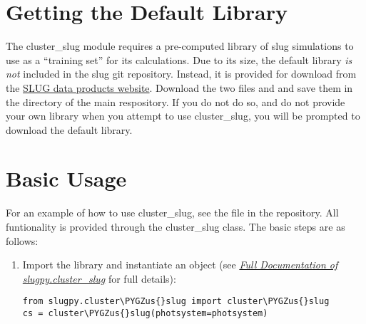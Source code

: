 \documentclass[letterpaper,10pt,english]{sphinxmanual}
\def\PYGZus{\char`\_}
\begin{document}
\section{Getting the Default Library}
\label{cluster_slug:getting-the-default-library}
The cluster\_slug module requires a pre-computed library of slug simulations to use as a ``training set'' for its calculations. Due to its size, the default library \emph{is not} included in the slug git repository. Instead, it is provided for download from the \href{http://www.slugsps.com/data}{SLUG data products website}. Download the two files  and  and save them in the  directory of the main respository. If you do not do so, and do not provide your own library when you attempt to use cluster\_slug, you will be prompted to download the default library.


\section{Basic Usage}
\label{cluster_slug:basic-usage}
For an example of how to use cluster\_slug, see the file  in the repository. All funtionality is provided through the cluster\_slug class. The basic steps are as follows:
\begin{enumerate}
\item {} 
Import the library and instantiate an  object (see {\hyperref[cluster_slug:ssec\string-cluster\string-slug\string-full]{\emph{Full Documentation of slugpy.cluster\_slug}}} for full details):

\begin{Verbatim}[commandchars=\\\{\}]
from slugpy.cluster\PYGZus{}slug import cluster\PYGZus{}slug
cs = cluster\PYGZus{}slug(photsystem=photsystem)
\end{Verbatim}

\end{enumerate}
\end{document}
